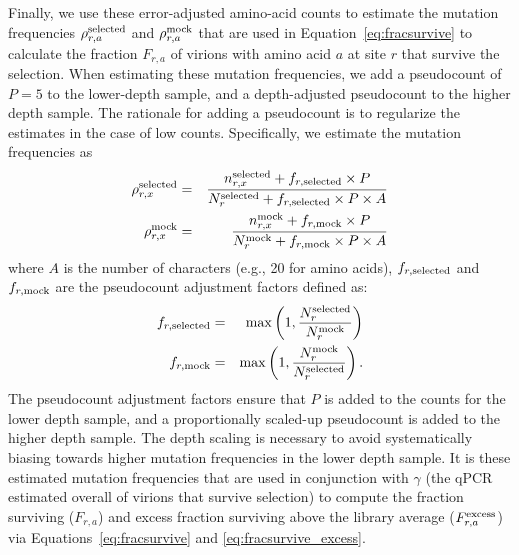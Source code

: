 \documentclass[11pt]{article}
\begin{document}
Finally, we use these error-adjusted amino-acid counts to estimate the mutation frequencies $\rho_{r,a}^{\rm{selected}}$ and $\rho_{r,a}^{\rm{mock}}$ that are used in Equation~\ref{eq:fracsurvive} to calculate the fraction $F_{r,a}$ of virions with amino acid $a$ at site $r$ that survive the selection.
When estimating these mutation frequencies, we add a pseudocount of $P = 5$ to the lower-depth sample, and a depth-adjusted pseudocount to the higher depth sample.
The rationale for adding a pseudocount is to regularize the estimates in the case of low counts.
Specifically, we estimate the mutation frequencies as
\begin{eqnarray}
\rho_{r,x}^{\rm{selected}} &=& \frac{n_{r,x}^{\rm{selected}} + f_{r, \rm{selected}} \times P}{N_r^{\rm{selected}} + f_{r, \rm{selected}} \times P \times A} \\
\rho_{r,x}^{\rm{mock}} &=& \frac{n_{r,x}^{\rm{mock}} + f_{r, \rm{mock}} \times P}{N_r^{\rm{mock}} + f_{r, \rm{mock}} \times P \times A} 
\end{eqnarray}
where $A$ is the number of characters (e.g., 20 for amino acids), $f_{r, \rm{selected}}$ and $f_{r, \rm{mock}}$ are the pseudocount adjustment factors defined as:
\begin{eqnarray}
f_{r, \rm{selected}} &=& \max\left(1, \frac{N_{r}^{\rm{selected}}}{N_{r}^{\rm{mock}}}\right) \\
f_{r, \rm{mock}} &=& \max\left(1, \frac{N_{r}^{\rm{mock}}}{N_{r}^{\rm{selected}}}\right).
\end{eqnarray}
The pseudocount adjustment factors ensure that $P$ is added to the counts for the lower depth sample, and a proportionally scaled-up pseudocount is added to the higher depth sample.
The depth scaling is necessary to avoid systematically biasing towards higher mutation frequencies in the lower depth sample.
It is these estimated mutation frequencies that are used in conjunction with $\gamma$ (the qPCR estimated overall of virions that survive selection) to compute the fraction surviving ($F_{r,a}$) and excess fraction surviving above the library average ($F_{r,a}^{\rm{excess}}$) via Equations~\ref{eq:fracsurvive} and \ref{eq:fracsurvive_excess}.
\end{document}
